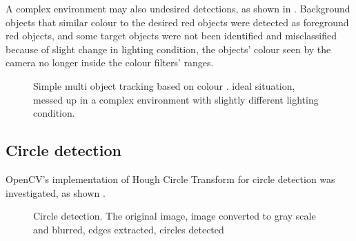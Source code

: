  A complex environment may also  undesired detections, as shown in . Background objects that  similar colour to the desired red objects were detected as foreground red objects, and some target objects were not been identified and misclassified because of  slight change in  lighting condition, the objects' colour seen by the camera  no longer inside the colour filters' ranges.

\begin{figure}[H]
  \centering
  \caption{Simple multi object tracking based on colour \cite{MOTBOC.git}.  ideal situation,  messed up in a complex environment with slightly different lighting condition.}
  \label{imp:MOTBOC}
\end{figure}

\subsection{Circle detection}

OpenCV's implementation of Hough Circle Transform for circle detection was investigated, as shown  .


\begin{figure}[H]
  \centering
  \caption{Circle detection.  The original image,  image converted to gray scale and blurred,  edges extracted,  circles detected}
  \label{Figure:circles}
\end{figure}

